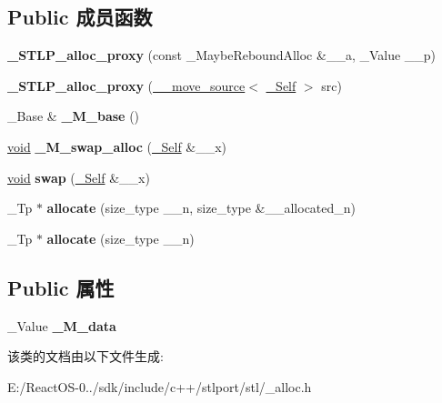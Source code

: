 \subsection*{Public 成员函数}
\begin{DoxyCompactItemize}
\item 
\mbox{\label{class___s_t_l_p__alloc__proxy_aed3e34e160a75c8966939b7425c5f6da}} 
{\bfseries \+\_\+\+S\+T\+L\+P\+\_\+alloc\+\_\+proxy} (const \+\_\+\+Maybe\+Rebound\+Alloc \&\+\_\+\+\_\+a, \+\_\+\+Value \+\_\+\+\_\+p)
\item 
\mbox{\label{class___s_t_l_p__alloc__proxy_a266a0ccc990df4e1f85c21a663c003da}} 
{\bfseries \+\_\+\+S\+T\+L\+P\+\_\+alloc\+\_\+proxy} (\hyperlink{class____move__source}{\+\_\+\+\_\+move\+\_\+source}$<$ \hyperlink{class___s_t_l_p__alloc__proxy}{\+\_\+\+Self} $>$ src)
\item 
\mbox{\label{class___s_t_l_p__alloc__proxy_ab42a10b7ec2cfe6cfeb3fcce7b9ebc28}} 
\+\_\+\+Base \& {\bfseries \+\_\+\+M\+\_\+base} ()
\item 
\mbox{\label{class___s_t_l_p__alloc__proxy_af738ddb532bdd1e7f68617f44611afc0}} 
\hyperlink{interfacevoid}{void} {\bfseries \+\_\+\+M\+\_\+swap\+\_\+alloc} (\hyperlink{class___s_t_l_p__alloc__proxy}{\+\_\+\+Self} \&\+\_\+\+\_\+x)
\item 
\mbox{\label{class___s_t_l_p__alloc__proxy_a3af3e4219063a8ac7e1a3a8697e89dca}} 
\hyperlink{interfacevoid}{void} {\bfseries swap} (\hyperlink{class___s_t_l_p__alloc__proxy}{\+\_\+\+Self} \&\+\_\+\+\_\+x)
\item 
\mbox{\label{class___s_t_l_p__alloc__proxy_a694b2a6d37f4f33b0a6fc73d83f03657}} 
\+\_\+\+Tp $\ast$ {\bfseries allocate} (size\+\_\+type \+\_\+\+\_\+n, size\+\_\+type \&\+\_\+\+\_\+allocated\+\_\+n)
\item 
\mbox{\label{class___s_t_l_p__alloc__proxy_afee043893e24a0d47ffcd0db4d91e00d}} 
\+\_\+\+Tp $\ast$ {\bfseries allocate} (size\+\_\+type \+\_\+\+\_\+n)
\end{DoxyCompactItemize}
\subsection*{Public 属性}
\begin{DoxyCompactItemize}
\item 
\mbox{\label{class___s_t_l_p__alloc__proxy_a85edf4f2ca253ef3dbe92a07453bf98b}} 
\+\_\+\+Value {\bfseries \+\_\+\+M\+\_\+data}
\end{DoxyCompactItemize}


该类的文档由以下文件生成\+:\begin{DoxyCompactItemize}
\item 
E\+:/\+React\+O\+S-\/0../sdk/include/c++/stlport/stl/\+\_\+alloc.\+h\end{DoxyCompactItemize}
